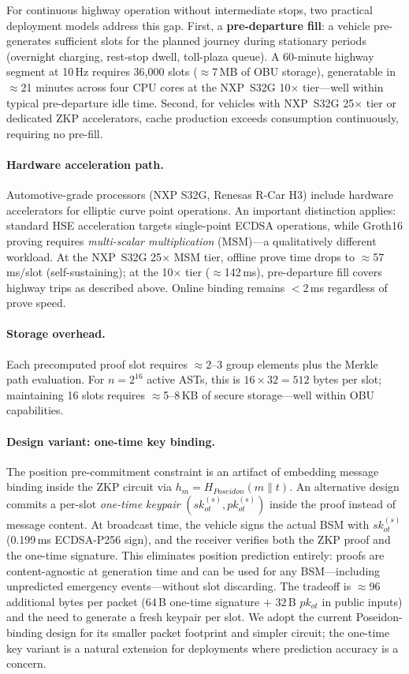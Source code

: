 For continuous highway operation without intermediate stops, two practical deployment
models address this gap. First, a \textbf{pre-departure fill}: a vehicle pre-generates
sufficient slots for the planned journey during stationary periods (overnight charging,
rest-stop dwell, toll-plaza queue). A 60-minute highway segment at 10\,Hz requires
36{,}000 slots ($\approx$7\,MB of OBU storage), generatable in $\approx$21 minutes
across four CPU cores at the NXP~S32G 10$\times$ tier---well within typical
pre-departure idle time. Second, for vehicles with NXP~S32G 25$\times$ tier or
dedicated ZKP accelerators, cache production exceeds consumption continuously,
requiring no pre-fill.

\paragraph{Hardware acceleration path.}
Automotive-grade processors (NXP S32G, Renesas R-Car H3) include hardware
accelerators for elliptic curve point operations. An important distinction applies:
standard HSE acceleration targets single-point ECDSA operations, while Groth16
proving requires \emph{multi-scalar multiplication} (MSM)---a qualitatively
different workload. At the NXP~S32G 25$\times$ MSM tier, offline prove time drops
to $\approx$57\,ms/slot (self-sustaining); at the 10$\times$ tier ($\approx$142\,ms),
pre-departure fill covers highway trips as described above. Online binding remains
$<$2\,ms regardless of prove speed.

\paragraph{Storage overhead.}
Each precomputed proof slot requires $\approx$2--3 group elements plus the Merkle
path evaluation. For $n=2^{16}$ active ASTs, this is $16 \times 32 = 512$ bytes
per slot; maintaining 16 slots requires $\approx$5--8\,KB of secure storage---well
within OBU capabilities.

\paragraph{Design variant: one-time key binding.}
The position pre-commitment constraint is an artifact of embedding message binding
inside the ZKP circuit via $h_m = H_{\mathit{Poseidon}}(m \| t)$. An alternative
design commits a per-slot \emph{one-time keypair} $(sk^{(s)}_{\mathit{ot}},
pk^{(s)}_{\mathit{ot}})$ inside the proof instead of message content. At broadcast
time, the vehicle signs the actual BSM with $sk^{(s)}_{\mathit{ot}}$ (0.199\,ms
ECDSA-P256 sign), and the receiver verifies both the ZKP proof and the one-time
signature. This eliminates position prediction entirely: proofs are content-agnostic
at generation time and can be used for any BSM---including unpredicted emergency
events---without slot discarding. The tradeoff is $\approx$96 additional bytes per
packet (64\,B one-time signature $+$ 32\,B $pk_{\mathit{ot}}$ in public inputs) and
the need to generate a fresh keypair per slot. We adopt the current Poseidon-binding
design for its smaller packet footprint and simpler circuit; the one-time key variant
is a natural extension for deployments where prediction accuracy is a concern.
